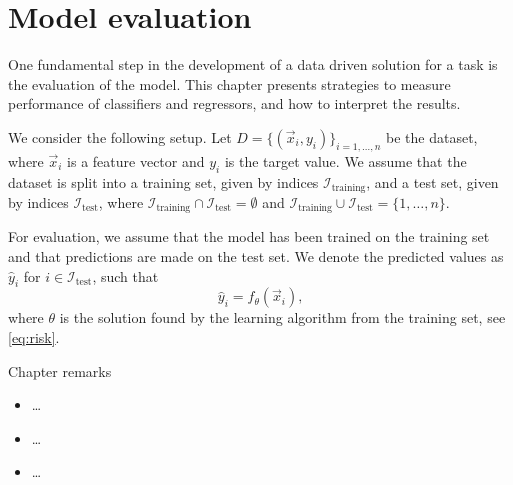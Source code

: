 \chapter{Model evaluation}
\label{chap:evaluation}

One fundamental step in the development of a data driven solution for a task is the
evaluation of the model. This chapter presents strategies to measure performance of
classifiers and regressors, and how to interpret the results.

We consider the following setup.  Let $D = \{(\vec{x}_i, y_i)\}_{i=1,\dots,n}$ be the
dataset, where $\vec{x}_i$ is a feature vector and $y_i$ is the target value.  We assume
that the dataset is split into a training set, given by indices
$\mathcal{I}_\text{training}$, and a test set, given by indices $\mathcal{I}_\text{test}$,
where $\mathcal{I}_\text{training} \cap \mathcal{I}_\text{test} = \emptyset$ and
$\mathcal{I}_\text{training} \cup \mathcal{I}_\text{test} = \{1,\dots,n\}$.

For evaluation, we assume that the model has been trained on the training set and that
predictions are made on the test set.  We denote the predicted values as $\hat{y}_i$ for
$i \in \mathcal{I}_\text{test}$, such that
\begin{equation*}
  \hat{y}_i = f_\theta(\vec{x}_i)\text{,}
\end{equation*}
where $\theta$ is the solution found by the learning algorithm from the training set, see
\cref{eq:risk}.

\begin{mainbox}{Chapter remarks}


  \startcontents[chapters]
  \vspace{1em}


  \begin{itemize}
    \item \dots
  \end{itemize}


  \begin{itemize}
    \item \dots
  \end{itemize}


  \begin{itemize}
    \item \dots
  \end{itemize}
\end{mainbox}

